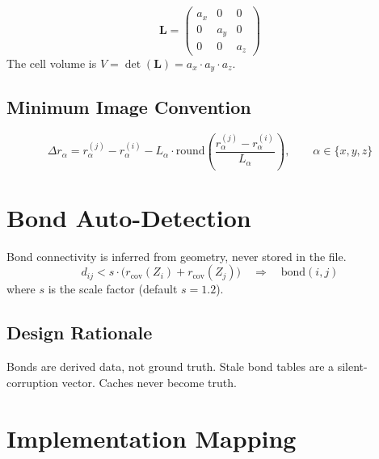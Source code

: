 \documentclass[12pt, a4paper, oneside]{article}
\begin{document}
\begin{equation}
  \mathbf{L} = \begin{pmatrix} a_x & 0 & 0 \\ 0 & a_y & 0 \\ 0 & 0 & a_z \end{pmatrix}
  \label{eq:lattice}
\end{equation}
The cell volume is $V = \det(\mathbf{L}) = a_x \cdot a_y \cdot a_z$.

\subsection{Minimum Image Convention}

\begin{equation}
  \Delta r_\alpha = r_\alpha^{(j)} - r_\alpha^{(i)}
    - L_\alpha \cdot \mathrm{round}\!\left(
      \frac{r_\alpha^{(j)} - r_\alpha^{(i)}}{L_\alpha}
    \right), \qquad \alpha \in \{x, y, z\}
  \label{eq:mic}
\end{equation}

\section{Bond Auto-Detection}
\label{sec:bonds}

Bond connectivity is inferred from geometry, never stored in the file.
\begin{equation}
  d_{ij} < s \cdot \bigl(r_{\text{cov}}(Z_i) + r_{\text{cov}}(Z_j)\bigr)
  \quad \Longrightarrow \quad \text{bond}(i, j) \label{eq:bond}
\end{equation}
where $s$ is the scale factor (default $s = 1.2$).

\subsection{Design Rationale}

Bonds are derived data, not ground truth.  Stale bond tables are a
silent-corruption vector.  Caches never become truth.

\section{Implementation Mapping}
\label{sec:impl}
\end{document}
